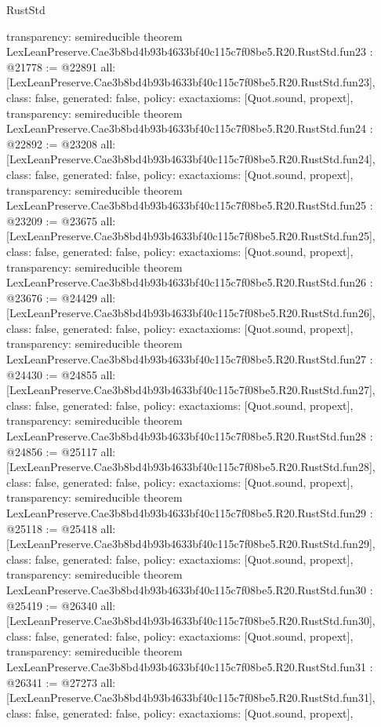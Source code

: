 \begin{lexlean}{RustStd}
\begin{coremodule}
{  transparency: semireducible
}
theorem LexLeanPreserve.Cae3b8bd4b93b4633bf40c115c7f08be5.R20.RustStd.fun23 : @21778 := @22891 {
  all: [LexLeanPreserve.Cae3b8bd4b93b4633bf40c115c7f08be5.R20.RustStd.fun23],
  class: false,
  generated: false,
  policy: exact{axioms: [Quot.sound, propext]},
  transparency: semireducible
}
theorem LexLeanPreserve.Cae3b8bd4b93b4633bf40c115c7f08be5.R20.RustStd.fun24 : @22892 := @23208 {
  all: [LexLeanPreserve.Cae3b8bd4b93b4633bf40c115c7f08be5.R20.RustStd.fun24],
  class: false,
  generated: false,
  policy: exact{axioms: [Quot.sound, propext]},
  transparency: semireducible
}
theorem LexLeanPreserve.Cae3b8bd4b93b4633bf40c115c7f08be5.R20.RustStd.fun25 : @23209 := @23675 {
  all: [LexLeanPreserve.Cae3b8bd4b93b4633bf40c115c7f08be5.R20.RustStd.fun25],
  class: false,
  generated: false,
  policy: exact{axioms: [Quot.sound, propext]},
  transparency: semireducible
}
theorem LexLeanPreserve.Cae3b8bd4b93b4633bf40c115c7f08be5.R20.RustStd.fun26 : @23676 := @24429 {
  all: [LexLeanPreserve.Cae3b8bd4b93b4633bf40c115c7f08be5.R20.RustStd.fun26],
  class: false,
  generated: false,
  policy: exact{axioms: [Quot.sound, propext]},
  transparency: semireducible
}
theorem LexLeanPreserve.Cae3b8bd4b93b4633bf40c115c7f08be5.R20.RustStd.fun27 : @24430 := @24855 {
  all: [LexLeanPreserve.Cae3b8bd4b93b4633bf40c115c7f08be5.R20.RustStd.fun27],
  class: false,
  generated: false,
  policy: exact{axioms: [Quot.sound, propext]},
  transparency: semireducible
}
theorem LexLeanPreserve.Cae3b8bd4b93b4633bf40c115c7f08be5.R20.RustStd.fun28 : @24856 := @25117 {
  all: [LexLeanPreserve.Cae3b8bd4b93b4633bf40c115c7f08be5.R20.RustStd.fun28],
  class: false,
  generated: false,
  policy: exact{axioms: [Quot.sound, propext]},
  transparency: semireducible
}
theorem LexLeanPreserve.Cae3b8bd4b93b4633bf40c115c7f08be5.R20.RustStd.fun29 : @25118 := @25418 {
  all: [LexLeanPreserve.Cae3b8bd4b93b4633bf40c115c7f08be5.R20.RustStd.fun29],
  class: false,
  generated: false,
  policy: exact{axioms: [Quot.sound, propext]},
  transparency: semireducible
}
theorem LexLeanPreserve.Cae3b8bd4b93b4633bf40c115c7f08be5.R20.RustStd.fun30 : @25419 := @26340 {
  all: [LexLeanPreserve.Cae3b8bd4b93b4633bf40c115c7f08be5.R20.RustStd.fun30],
  class: false,
  generated: false,
  policy: exact{axioms: [Quot.sound, propext]},
  transparency: semireducible
}
theorem LexLeanPreserve.Cae3b8bd4b93b4633bf40c115c7f08be5.R20.RustStd.fun31 : @26341 := @27273 {
  all: [LexLeanPreserve.Cae3b8bd4b93b4633bf40c115c7f08be5.R20.RustStd.fun31],
  class: false,
  generated: false,
  policy: exact{axioms: [Quot.sound, propext]},
}
\end{coremodule}
\end{lexlean}
